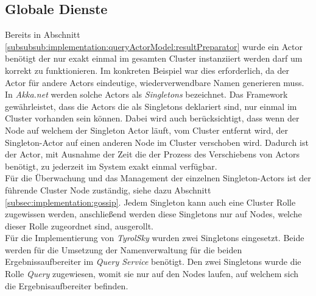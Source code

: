 \subsection{Globale Dienste}
\label{subsec:implementation:singeltons}
Bereits in Abschnitt \ref{subsubsub:implementation:queryActorModel:resultPreparator} wurde ein Actor benötigt der nur exakt einmal im gesamten Cluster instanziiert werden darf um korrekt zu funktionieren. Im konkreten Beispiel war dies erforderlich, da der Actor für andere Actors eindeutige, wiederverwendbare Namen generieren muss. In \textit{Akka.net} werden solche Actors als \textit{Singletons} bezeichnet. Das Framework gewährleistet, dass die Actors die als Singletons deklariert sind, nur einmal im Cluster vorhanden sein können. Dabei wird auch berücksichtigt, dass wenn der Node auf welchem der Singleton Actor läuft, vom Cluster entfernt wird, der Singleton-Actor auf einen anderen Node im Cluster verschoben wird. Dadurch ist der Actor, mit Ausnahme der Zeit die der Prozess des Verschiebens von Actors benötigt, zu jederzeit im System exakt einmal verfügbar. \\
Für die Überwachung und das Management der einzelnen Singleton-Actors ist der führende Cluster Node zuständig, siehe dazu Abschnitt \ref{subsec:implementation:gossip}. Jedem Singleton kann auch eine Cluster Rolle zugewissen werden, anschließend werden diese Singletons nur auf Nodes, welche dieser Rolle zugeordnet sind, ausgerollt. \\
Für die Implementierung von \textit{TyrolSky} wurden zwei Singletons eingesetzt. Beide werden für die Umsetzung der Namenverwaltung für die beiden Ergebnissaufbereiter im \textit{Query Service} benötigt. Den zwei Singletons wurde die Rolle \textit{Query} zugewiesen, womit sie nur auf den Nodes laufen, auf welchem sich die Ergebnisaufbereiter befinden.

